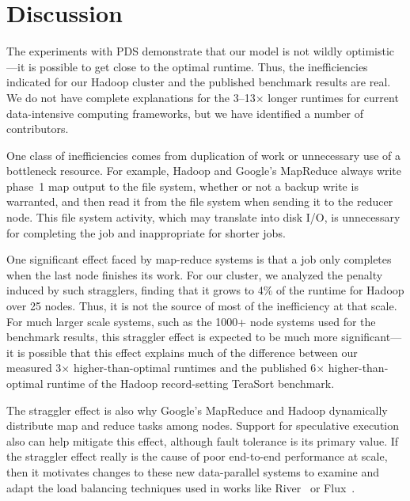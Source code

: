 \section{Discussion}
\label{sec:discussion}

The experiments with PDS demonstrate that our model is not wildly
optimistic---it is possible to get close to the optimal runtime.
Thus, the inefficiencies indicated for our Hadoop cluster and the
published benchmark results are real.  We do not have complete
explanations for the 3--13$\times$ longer runtimes for current
data-intensive computing frameworks, but we have identified a number
of contributors.

One class of inefficiencies comes from duplication of work or
unnecessary use of a bottleneck resource.  For example, Hadoop and
Google's MapReduce always write phase~1 map output to the file system,
whether or not a backup write is warranted, and then read it from the
file system when sending it to the reducer node.  This file system
activity, which may translate into disk I/O, is unnecessary for
completing the job and inappropriate for shorter jobs.

One significant effect faced by map-reduce systems is that a job only
completes when the last node finishes its work.  For our cluster, we
analyzed the penalty induced by such stragglers, finding that it grows
to 4\% of the runtime for Hadoop over 25 nodes.  Thus, it is not the
source of most of the inefficiency at that scale.  For much larger
scale systems, such as the 1000+ node systems used for the benchmark
results, this straggler effect is expected to be much more
significant---it is possible that this effect explains much of the
difference between our measured 3$\times$ higher-than-optimal runtimes
and the published 6$\times$ higher-than-optimal runtime of the Hadoop
record-setting TeraSort benchmark.

The straggler effect is also why Google's MapReduce and Hadoop
dynamically distribute map and reduce tasks among nodes.  Support for
speculative execution also can help mitigate this effect, although
fault tolerance is its primary value.  If the straggler effect really
is the cause of poor end-to-end performance at scale, then it
motivates changes to these new data-parallel systems to examine and
adapt the load balancing techniques used in works like
River~\cite{river} or Flux~\cite{flux}.

